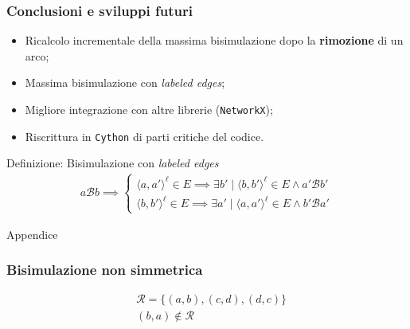 \documentclass{beamer}
\begin{document}
\begin{frame}\frametitle{Conclusioni e sviluppi futuri}
    \begin{itemize}
        \item Ricalcolo incrementale della massima bisimulazione dopo la \textbf{rimozione} di un arco;
        \item Massima bisimulazione con \emph{labeled edges};
        \item Migliore integrazione con altre librerie (\texttt{NetworkX});
        \item Riscrittura in \texttt{Cython} di parti critiche del codice.
    \end{itemize}

    \begin{block}{Definizione: Bisimulazione con \emph{labeled edges}}
        \begin{gather*}
            a \mathcal{B} b \implies
            \begin{cases}
                \langle a, a' \rangle^\ell \in E \implies \exists b' \mid \langle b, b' \rangle^\ell \in E \land a' \mathcal{B} b'\\
                \langle b, b' \rangle^\ell \in E \implies \exists a' \mid \langle a, a' \rangle^\ell \in E \land b' \mathcal{B} a'
            \end{cases}
        \end{gather*}
    \end{block}
\end{frame}

\begin{frame}
    Appendice
\end{frame}

\begin{frame}\frametitle{Bisimulazione non simmetrica}
    \begin{figure}[t]
        \centering
    \end{figure}

    \begin{align*}
        &\mathcal{R} = \{(a,b), (c,d), (d,c)\}\\
        &(b,a) \not\in \mathcal{R}
    \end{align*}
\end{frame}
\end{document}
